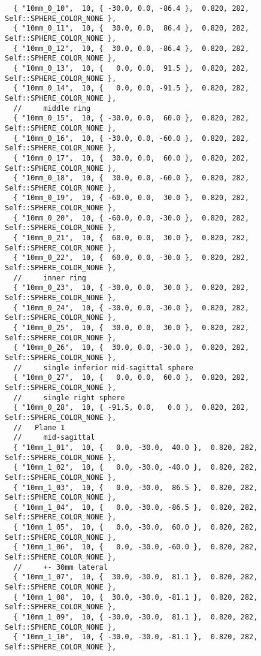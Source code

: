 \documentclass{InsightArticle}
\begin{document}
{\begin{verbatim}
  { "10mm_0_10",  10, { -30.0, 0.0, -86.4 },  0.820, 282, Self::SPHERE_COLOR_NONE },
  { "10mm_0_11",  10, {  30.0, 0.0,  86.4 },  0.820, 282, Self::SPHERE_COLOR_NONE },
  { "10mm_0_12",  10, {  30.0, 0.0, -86.4 },  0.820, 282, Self::SPHERE_COLOR_NONE },
  { "10mm_0_13",  10, {   0.0, 0.0,  91.5 },  0.820, 282, Self::SPHERE_COLOR_NONE },
  { "10mm_0_14",  10, {   0.0, 0.0, -91.5 },  0.820, 282, Self::SPHERE_COLOR_NONE },
  //     middle ring
  { "10mm_0_15",  10, { -30.0, 0.0,  60.0 },  0.820, 282, Self::SPHERE_COLOR_NONE },
  { "10mm_0_16",  10, { -30.0, 0.0, -60.0 },  0.820, 282, Self::SPHERE_COLOR_NONE },
  { "10mm_0_17",  10, {  30.0, 0.0,  60.0 },  0.820, 282, Self::SPHERE_COLOR_NONE },
  { "10mm_0_18",  10, {  30.0, 0.0, -60.0 },  0.820, 282, Self::SPHERE_COLOR_NONE },
  { "10mm_0_19",  10, { -60.0, 0.0,  30.0 },  0.820, 282, Self::SPHERE_COLOR_NONE },
  { "10mm_0_20",  10, { -60.0, 0.0, -30.0 },  0.820, 282, Self::SPHERE_COLOR_NONE },
  { "10mm_0_21",  10, {  60.0, 0.0,  30.0 },  0.820, 282, Self::SPHERE_COLOR_NONE },
  { "10mm_0_22",  10, {  60.0, 0.0, -30.0 },  0.820, 282, Self::SPHERE_COLOR_NONE },
  //     inner ring
  { "10mm_0_23",  10, { -30.0, 0.0,  30.0 },  0.820, 282, Self::SPHERE_COLOR_NONE },
  { "10mm_0_24",  10, { -30.0, 0.0, -30.0 },  0.820, 282, Self::SPHERE_COLOR_NONE },
  { "10mm_0_25",  10, {  30.0, 0.0,  30.0 },  0.820, 282, Self::SPHERE_COLOR_NONE },
  { "10mm_0_26",  10, {  30.0, 0.0, -30.0 },  0.820, 282, Self::SPHERE_COLOR_NONE },
  //     single inferior mid-sagittal sphere
  { "10mm_0_27",  10, {   0.0, 0.0,  60.0 },  0.820, 282, Self::SPHERE_COLOR_NONE },
  //     single right sphere
  { "10mm_0_28",  10, { -91.5, 0.0,   0.0 },  0.820, 282, Self::SPHERE_COLOR_NONE },
  //   Plane 1
  //     mid-sagittal
  { "10mm_1_01",  10, {   0.0, -30.0,  40.0 },  0.820, 282, Self::SPHERE_COLOR_NONE },
  { "10mm_1_02",  10, {   0.0, -30.0, -40.0 },  0.820, 282, Self::SPHERE_COLOR_NONE },
  { "10mm_1_03",  10, {   0.0, -30.0,  86.5 },  0.820, 282, Self::SPHERE_COLOR_NONE },
  { "10mm_1_04",  10, {   0.0, -30.0, -86.5 },  0.820, 282, Self::SPHERE_COLOR_NONE },
  { "10mm_1_05",  10, {   0.0, -30.0,  60.0 },  0.820, 282, Self::SPHERE_COLOR_NONE },
  { "10mm_1_06",  10, {   0.0, -30.0, -60.0 },  0.820, 282, Self::SPHERE_COLOR_NONE },
  //     +- 30mm lateral
  { "10mm_1_07",  10, {  30.0, -30.0,  81.1 },  0.820, 282, Self::SPHERE_COLOR_NONE },
  { "10mm_1_08",  10, {  30.0, -30.0, -81.1 },  0.820, 282, Self::SPHERE_COLOR_NONE },
  { "10mm_1_09",  10, { -30.0, -30.0,  81.1 },  0.820, 282, Self::SPHERE_COLOR_NONE },
  { "10mm_1_10",  10, { -30.0, -30.0, -81.1 },  0.820, 282, Self::SPHERE_COLOR_NONE },

\end{verbatim}}
\end{document}
